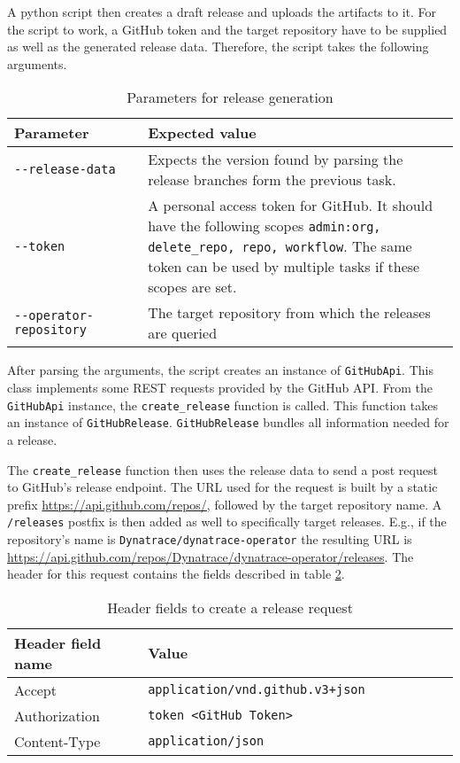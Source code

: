 A python script then creates a draft release and uploads the artifacts to it.
For the script to work, a GitHub token and the target repository have to be supplied as well as the generated release data.
Therefore, the script takes the following arguments.

\begin{table}
    \centering
    \caption{Parameters for release generation}
    \label{tab:parameters-for-release-generation}
    \begin{tabular}{p{0.3\linewidth}|p{0.7\linewidth}}
        Parameter & Expected value \\
        \hline
        \verb|--release-data| & Expects the version found by parsing the release branches form the previous task. \\
        \verb|--token| & A personal access token for GitHub.
            It should have the following scopes \verb|admin:org, delete_repo, repo, workflow|.
            The same token can be used by multiple tasks if these scopes are set. \\
        \verb|--operator-repository| & The target repository from which the releases are queried \\
    \end{tabular}
\end{table}

After parsing the arguments, the script creates an instance of \verb|GitHubApi|.
This class implements some REST requests provided by the GitHub API.
From the \verb|GitHubApi| instance, the \verb|create_release| function is called.
This function takes an instance of \verb|GitHubRelease|.
\verb|GitHubRelease| bundles all information needed for a release.

The \verb|create_release| function then uses the release data to send a post request to GitHub's release endpoint.
The URL used for the request is built by a static prefix \url{https://api.github.com/repos/}, followed by the target repository name.
A \verb|/releases| postfix is then added as well to specifically target releases.
E.g., if the repository's name is \verb|Dynatrace/dynatrace-operator| the resulting URL is \url{https://api.github.com/repos/Dynatrace/dynatrace-operator/releases}.
The header for this request contains the fields described in table \ref{tab:header-fields-to-create-a-release-request}.

\begin{table}
    \centering
    \caption{Header fields to create a release request}
    \label{tab:header-fields-to-create-a-release-request}
    \begin{tabular}{|p{0.3\linewidth}|p{0.7\linewidth}|}
        Header field name & Value \\
        \hline
        Accept & \verb|application/vnd.github.v3+json|  \\
        Authorization & \verb|token <GitHub Token>| \\
        Content-Type & \verb|application/json| \\
    \end{tabular}
\end{table}

